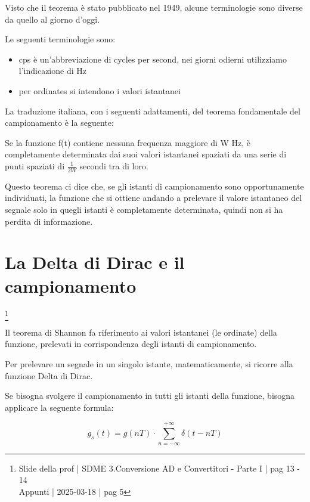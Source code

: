 Visto che il teorema è stato pubblicato nel 1949, alcune terminologie sono diverse da quello al giorno d'oggi. \newline 

Le seguenti terminologie sono: 

\begin{itemize}
    \item cps è un'abbreviazione di cycles per second, nei giorni odierni utilizziamo l'indicazione di Hz 
    \item per ordinates si intendono i valori istantanei 
\end{itemize}

La traduzione italiana, con i seguenti adattamenti, del teorema fondamentale del campionamento è la seguente: \newline 

Se la funzione f(t) contiene nessuna frequenza maggiore di W Hz, è completamente determinata dai 
suoi valori istantanei spaziati da una serie di punti spaziati di $\frac{1}{2W}$ secondi tra di loro. \newline 

Questo teorema ci dice che, se gli istanti di campionamento sono opportunamente individuati, 
la funzione che si ottiene andando a prelevare il valore istantaneo del segnale solo in quegli istanti è completamente determinata, quindi non si ha perdita di informazione. \newline 

\newpage 

\section{La Delta di Dirac e il campionamento}
\footnote{Slide della prof | SDME 3.Conversione AD e Convertitori - Parte I | pag 13 - 14 \\  
Appunti | 2025-03-18 | pag 5}

Il teorema di Shannon fa riferimento ai valori istantanei (le ordinate) della funzione, 
prelevati in corrispondenza degli istanti di campionamento. \newline 

Per prelevare un segnale in un singolo istante, matematicamente, si ricorre alla funzione Delta di Dirac. \newline 

Se bisogna svolgere il campionamento in tutti gli istanti della funzione, bisogna applicare la seguente formula:

{
    \Large 
    \begin{equation}
        g_s (t) = g(nT) \cdot \sum_{n = - \infty}^{+ \infty} \delta (t - nT)
    \end{equation}
}

